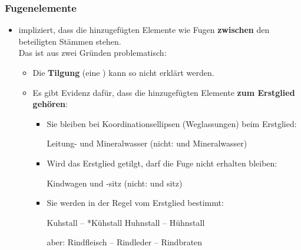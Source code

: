 \begin{frame}
\frametitle{Fugenelemente}

\begin{itemize}
	\item {} impliziert, dass die hinzugefügten Elemente wie Fugen \textbf{zwischen} den beteiligten Stämmen stehen. \\
	Das ist aus zwei Gründen problematisch:

	\begin{itemize}
		\item Die \textbf{Tilgung} (eine ) kann so nicht erklärt werden.
		\item Es gibt Evidenz dafür, dass die hinzugefügten Elemente \textbf{zum Erstglied gehören}:

\pause 
	
	\begin{itemize}
		\item Sie bleiben bei Koordinationsellipsen (Weglassungen) beim Erstglied:
		
		\ea Leitung- und Mineralwasser (nicht: und Mineralwasser)
		\z
		
		\item Wird das Erstglied getilgt, darf die Fuge nicht erhalten bleiben:
		
		\ea Kindwagen und -sitz (nicht: und sitz)
		\z
		
		\item Sie werden in der Regel vom Erstglied bestimmt:
		
		\ea Kuhstall -- *Kühstall \vs *Huhnstall -- Hühnstall
		\z
		
		\ea aber: Rind\alertred{\_}fleisch -- Rindleder -- Rindbraten
		\z
		
	\end{itemize}


\end{itemize}
\end{itemize}
\end{frame}


